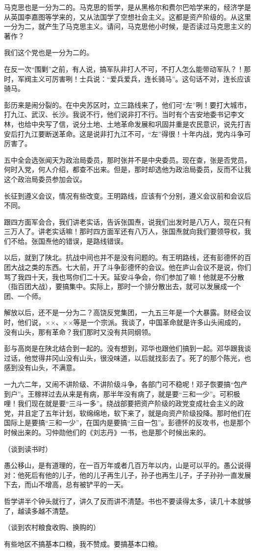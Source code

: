 马克思也是一分为二的。马克思的哲学，是从黑格尔和费尔巴哈学来的，经济学是从英国李嘉图等学来的，又从法国学了空想社会主义。这都是资产阶级的。从这里一分为二，就产生了马克思主义。请问，马克思他小时候，是否读过马克思主义的著作？

我们这个党也是一分为二的。

在反一次“围剿”之前，有人说，搞军队非打人不可，不打人怎么能带动军队？！那时，军阀主义可厉害咧！士兵说：“爱兵爱兵，连长骑马”。这句话不对，连长应该骑马。

彭历来是闹分裂的。在中央苏区时，立三路线来了，他们可“左”咧！要打大城市，打九江、武汉、长沙。我说不行，他们说非打不行。当时有个吉安地委书记李文林，也给中央写了信，说分土地、土地革命发展和巩固并重是农民意识，说先打吉安后打九江要断送革命。这是说非打九江不可，“左”得很！十年内战，党内斗争可厉害了。

五中全会选张闻天为政治局委员，那时张并不是中央委员。现在查，张是否党员，何时入党，何人介绍，都查不出来。但是，那时却选他为政治局委员，反而不让我这个政治局委员参加会议。

长征到遵义会议，情况有些改变。王明路线，应该有个分别，遵义会议前和会议后不同。

跟四方面军会合，我们讲老实话，告诉张国焘，说我们出发时是八万人，现在只有三万人了。讲老实话嘛！那时四方面军还有八万人，张国焘就向我们要领导权，我们不给。张国焘他的错误，是路线错误。

以后，就到了陕北。抗战中间也并不是没有问题的。有王明路线，还有彭德怀的百团大战之类的东西。七大前，开了斗争彭德怀的会议。他在庐山会议不是说，你们骂了我四十天，我也骂你们二十天。延安斗争会，你们参加了嘛！他就是不分散（指百团大战），要搞集中。实际上，那时一个排分散出去，就可以发展成一个团、一个师。

解放以后，还不是一分为二？高饶反党集团，一九五三年是一个大暴露。财经会议时，他们说，××、××等是一个宗派。我谈了，中国革命就是许多山头闹成的，没有山头，那有革命？我们那时又没有共同纲领。

彭与高岗是在陕北结合到一起的。没有想到，邓华也跟他们搞到一起。邓华跟我谈过话，他觉得井冈山没有山头，很没味道，以后就找彭去了。死了的那个陈光，也感到没有山头，不满意。

一九六二年，又闹不讲阶级、不讲阶级斗争，各部门可不稳呢！邓子恢要搞“包产到户”。王稼祥过去从来是有病，那半年没有病了，就是要“三和一少”。可积极哩！我们现在就是要“三斗一多”。绕战部要把资产阶级的政党变成社会主义的政党，并且定了五年计划，软绵绵地，软下来了，就是向资产阶级投降。那时他们在国际上是要搞“三和一少”，在国内是要搞“三自一包”。彭德怀的反攻书，也是那个时候出来的。习仲勋他们的《刘志丹》一书，也是那个时候出来的。

（谈到读书时）

愚公移山，是有道理的，在一百万年或者几百万年以内，山是可以平的。愚公说得对：他死后有他的儿子，他的儿子再生儿子，孙子也再生儿子，子子孙孙一直发展下去，而山不增高，总有被铲平的一天。

哲学讲半个钟头就行了，讲久了反而讲不清楚。书也不要读得太多，读几十本就够了，越读多越不清楚。

（谈到农村粮食收购、换购的）

有些地区不搞基本口粮，我不赞成。要搞基本口粮。
